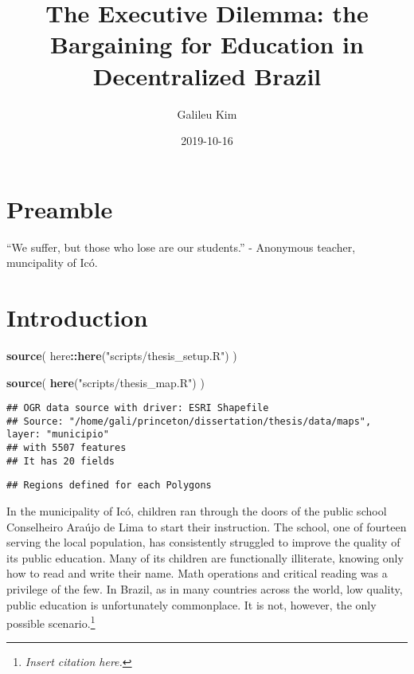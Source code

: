 \documentclass[12pt,]{book}
\title{The Executive Dilemma: the Bargaining for Education in Decentralized Brazil}
\author{Galileu Kim}
\date{2019-10-16}
\newenvironment{Shaded}{\begin{snugshade}}{\end{snugshade}}
\newcommand{\KeywordTok}[1]{\textcolor[rgb]{0.13,0.29,0.53}{\textbf{#1}}}
\newcommand{\NormalTok}[1]{#1}
\newcommand{\OperatorTok}[1]{\textcolor[rgb]{0.81,0.36,0.00}{\textbf{#1}}}
\newcommand{\StringTok}[1]{\textcolor[rgb]{0.31,0.60,0.02}{#1}}
\let\rmarkdownfootnote\footnote%
\def\footnote{\protect\rmarkdownfootnote}
\begin{document}
\maketitle

{
\setcounter{tocdepth}{1}
\tableofcontents
}
\hypertarget{preamble}{%
\chapter{Preamble}\label{preamble}}

``We suffer, but those who lose are our students.'' - Anonymous teacher, muncipality of Icó.

\hypertarget{introduction}{%
\chapter{Introduction}\label{introduction}}

\begin{Shaded}
\begin{Highlighting}[]
\KeywordTok{source}\NormalTok{(}
\NormalTok{  here}\OperatorTok{::}\KeywordTok{here}\NormalTok{(}\StringTok{"scripts/thesis_setup.R"}\NormalTok{)}
\NormalTok{)}

\KeywordTok{source}\NormalTok{(}
  \KeywordTok{here}\NormalTok{(}\StringTok{"scripts/thesis_map.R"}\NormalTok{)}
\NormalTok{)}
\end{Highlighting}
\end{Shaded}

\begin{verbatim}
## OGR data source with driver: ESRI Shapefile 
## Source: "/home/gali/princeton/dissertation/thesis/data/maps", layer: "municipio"
## with 5507 features
## It has 20 fields
\end{verbatim}

\begin{verbatim}
## Regions defined for each Polygons
\end{verbatim}

\begin{Shaded}
\end{Shaded}

In the municipality of Icó, children ran through the doors of the public school Conselheiro Araújo de Lima to start their instruction. The school, one of fourteen serving the local population, has consistently struggled to improve the quality of its public education. Many of its children are functionally illiterate, knowing only how to read and write their name. Math operations and critical reading was a privilege of the few. In Brazil, as in many countries across the world, low quality, public education is unfortunately commonplace. It is not, however, the only possible scenario.\footnote{\textit{Insert citation here.}}
\end{document}
